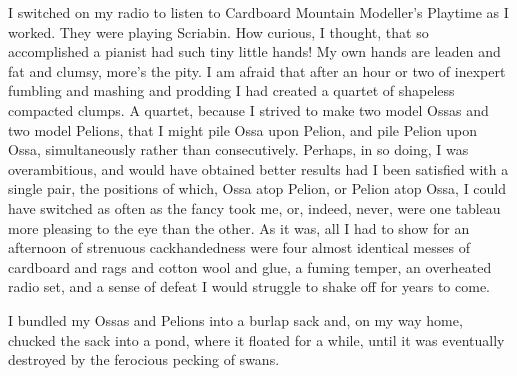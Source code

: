 I switched on my radio to listen to Cardboard Mountain Modeller's Playtime as I worked. They were playing Scriabin. How curious, I thought, that so accomplished a pianist had such tiny little hands! My own hands are leaden and fat and clumsy, more's the pity. I am afraid that after an hour or two of inexpert fumbling and mashing and prodding I had created a quartet of shapeless compacted clumps. A quartet, because I strived to make two model Ossas and two model Pelions, that I might pile Ossa upon Pelion, and pile Pelion upon Ossa, simultaneously rather than consecutively. Perhaps, in so doing, I was overambitious, and would have obtained better results had I been satisfied with a single pair, the positions of which, Ossa atop Pelion, or Pelion atop Ossa, I could have switched as often as the fancy took me, or, indeed, never, were one tableau more pleasing to the eye than the other. As it was, all I had to show for an afternoon of strenuous cackhandedness were four almost identical messes of cardboard and rags and cotton wool and glue, a fuming temper, an overheated radio set, and a sense of defeat I would struggle to shake off for years to come.

I bundled my Ossas and Pelions into a burlap sack and, on my way home, chucked the sack into a pond, where it floated for a while, until it was eventually destroyed by the ferocious pecking of swans.